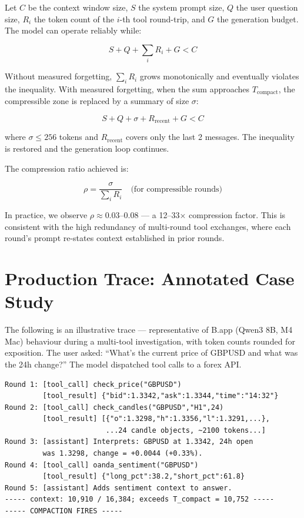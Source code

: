 \documentclass[11pt,a4paper]{article}
\begin{document}
Let $C$ be the context window size, $S$ the system prompt size, $Q$ the user question size, $R_i$ the token count of the $i$-th tool round-trip, and $G$ the generation budget. The model can operate reliably while:

\begin{equation}
S + Q + \sum_{i} R_i + G < C
\label{eq:budget}
\end{equation}

\noindent Without measured forgetting, $\sum_{i} R_i$ grows monotonically and eventually violates the inequality. With measured forgetting, when the sum approaches $T_{\text{compact}}$, the compressible zone is replaced by a summary of size $\sigma$:

\begin{equation}
S + Q + \sigma + R_{\text{recent}} + G < C
\label{eq:compact}
\end{equation}

\noindent where $\sigma \leq 256$ tokens and $R_{\text{recent}}$ covers only the last 2 messages. The inequality is restored and the generation loop continues.

The compression ratio achieved is:

\begin{equation}
\rho = \frac{\sigma}{\sum_{i} R_i} \quad \text{(for compressible rounds)}
\label{eq:ratio}
\end{equation}

\noindent In practice, we observe $\rho \approx 0.03$--$0.08$ --- a 12--33$\times$ compression factor. This is consistent with the high redundancy of multi-round tool exchanges, where each round's prompt re-states context established in prior rounds.

\section{Production Trace: Annotated Case Study}
\label{sec:trace}

The following is an illustrative trace --- representative of B.app (Qwen3 8B, M4 Mac) behaviour during a multi-tool investigation, with token counts rounded for exposition. The user asked: ``What's the current price of GBPUSD and what was the 24h change?'' The model dispatched tool calls to a forex API.

\begin{small}
\begin{verbatim}
Round 1: [tool_call] check_price("GBPUSD")
         [tool_result] {"bid":1.3342,"ask":1.3344,"time":"14:32"}
Round 2: [tool_call] check_candles("GBPUSD","H1",24)
         [tool_result] [{"o":1.3298,"h":1.3356,"l":1.3291,...},
                        ...24 candle objects, ~2100 tokens...]
Round 3: [assistant] Interprets: GBPUSD at 1.3342, 24h open
         was 1.3298, change = +0.0044 (+0.33%).
Round 4: [tool_call] oanda_sentiment("GBPUSD")
         [tool_result] {"long_pct":38.2,"short_pct":61.8}
Round 5: [assistant] Adds sentiment context to answer.
----- context: 10,910 / 16,384; exceeds T_compact = 10,752 -----
----- COMPACTION FIRES -----
\end{verbatim}
\end{small}
\end{document}
